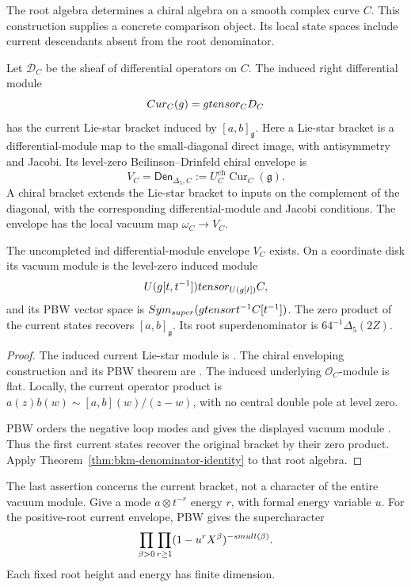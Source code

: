 The root algebra determines a chiral algebra on a smooth complex
curve $C$. This construction supplies a concrete comparison object.
Its local state spaces include current descendants absent from the
root denominator.

\begin{definition}
\label{def:bkm-formal-current-envelope}
Let $\mathcal D_C$ be the sheaf of differential operators on $C$.
The induced right differential module
\[
 Cur_C(g)=gtensor_{C}D_C
\]
has the current Lie-star bracket induced by $[a,b]_{\mathfrak g}$.
Here a Lie-star bracket is a differential-module map to the
small-diagonal direct image, with antisymmetry and Jacobi.
Its level-zero Beilinson--Drinfeld chiral envelope is
\[
 V_C=\mathsf{Den}_{\Delta_5,C}
 :=U_C^{\mathrm{ch}}\operatorname{Cur}_C(\mathfrak g).
\]
A chiral bracket extends the Lie-star bracket to inputs on the
complement of the diagonal, with the corresponding differential-module
and Jacobi conditions. The envelope has the local vacuum map
$\omega_C\to V_C$.
\end{definition}

\begin{proposition}
\label{prop:bkm-formal-current-envelope}
The uncompleted ind differential-module envelope $V_C$ exists.
On a coordinate disk its vacuum module is the level-zero induced
module
\[
 U(g[t,t^{-1}])
       tensor_{U(g[t])}C,
\]
and its PBW vector space is
$Sym_{super}
 (gtensor t^{-1}C[t^{-1}])$.
The zero product of the current states recovers $[a,b]_{\mathfrak g}$.
Its root superdenominator is $64^{-1}\Delta_5(2Z)$.
\end{proposition}
\begin{proof}
The induced current Lie-star module is
\cite[Section~2.5.6(b)(ii)]{BD}. The chiral enveloping construction
and its PBW theorem are \cite[Sections~3.7.1 and~3.7.14]{BD}.
The induced underlying $\mathcal O_C$-module is flat.
Locally, the current operator product is
$a(z)b(w)\sim[a,b](w)/(z-w)$, with no central double pole at level
zero.

PBW orders the negative loop modes and gives the displayed
vacuum module \cite{KACVA}. Thus the first current states recover
the original bracket by their zero product. Apply
Theorem~\ref{thm:bkm-denominator-identity} to that root algebra.
\end{proof}

The last assertion concerns the current bracket, not a character of
the entire vacuum module. Give a mode $a\otimes t^{-r}$ energy
$r$, with formal energy variable $u$. For the positive-root current
envelope, PBW gives the supercharacter
\begin{equation}
\label{eq:bkm-current-supercharacter}
 \prod_{\beta>0}\prod_{r\geq1}
           (1-u^rX^\beta)^{-smult(\beta)}.
\end{equation}
Each fixed root height and energy has finite dimension.

